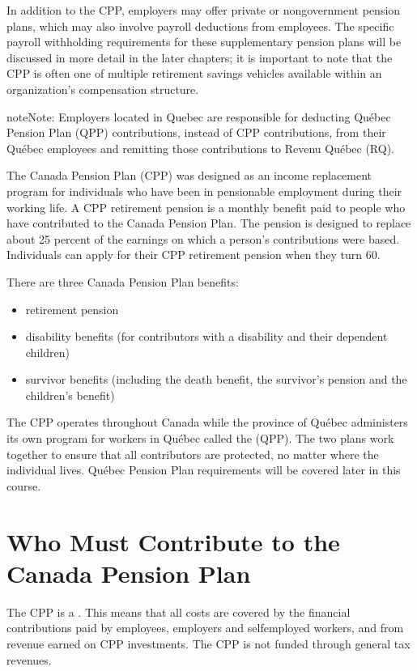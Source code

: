 \documentclass[letterpaper,10pt,english]{sphinxmanual}
\begin{document}
\sphinxAtStartPar
In addition to the CPP, employers may offer private or non\sphinxhyphen{}government pension plans, which may also involve payroll
deductions from employees. The specific payroll withholding requirements for these supplementary pension plans will be discussed
in more detail in the later chapters; it is important to note that the CPP is often one of multiple retirement savings
vehicles available within an organization’s compensation structure.

\begin{sphinxadmonition}{note}{Note:}
\sphinxAtStartPar
Employers located in Quebec are responsible for deducting Québec Pension Plan (QPP) contributions, instead
of CPP contributions, from their Québec employees and remitting those contributions to Revenu Québec (RQ).
\end{sphinxadmonition}

\sphinxAtStartPar
The Canada Pension Plan (CPP) was designed as an income replacement program for individuals who have been in pensionable
employment during their working life. A CPP retirement pension is a monthly benefit paid to people who have contributed to
the Canada Pension Plan. The pension is designed to replace about 25 percent of the earnings on which a person’s contributions
were based. Individuals can apply for their CPP retirement pension when they turn 60.

\sphinxAtStartPar
There are three Canada Pension Plan benefits:
\begin{itemize}
\item {} 
\sphinxAtStartPar
retirement pension

\item {} 
\sphinxAtStartPar
disability benefits (for contributors with a disability and their dependent children)

\item {} 
\sphinxAtStartPar
survivor benefits (including the death benefit, the survivor’s pension and the children’s benefit)

\end{itemize}

\sphinxAtStartPar
The CPP operates throughout Canada while the province of Québec administers its own program for workers in Québec called the
 (QPP). The two plans work together to ensure that all contributors are protected, no matter where the
individual lives. Québec Pension Plan requirements will be covered later in this course.


\section{Who Must Contribute to the Canada Pension Plan}
\label{\detokenize{cpp-and-ei:who-must-contribute-to-the-canada-pension-plan}}
\sphinxAtStartPar
The CPP is a . This means that all costs are covered by the financial contributions paid by employees,
employers and self\sphinxhyphen{}employed workers, and from revenue earned on CPP investments. The CPP is not funded through general tax
revenues.
\end{document}
